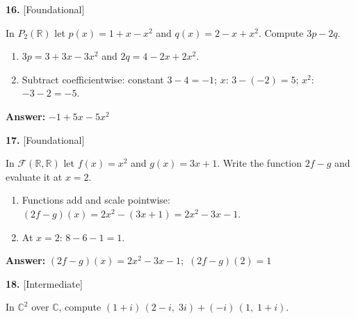 \documentclass[11pt]{article}
\begin{document}
\par\vspace{2pt}
\begin{minipage}{\linewidth}\textbf{16.} \hfill{\scriptsize\color{ink}[Foundational]}\par\nopagebreak In $P_{2}(\mathbb{R})$ let $p(x)=1+x-x^{2}$ and $q(x)=2-x+x^{2}$. Compute $3p-2q$.
\end{minipage}\par\nopagebreak
\begin{tcolorbox}[breakable,colback=ans,colframe=ansb,boxrule=0.5pt,left=4pt,right=4pt,top=2pt,bottom=2pt]\begin{enumerate}[leftmargin=2.2em,itemsep=1pt,topsep=1pt,label=\textbf{Step \arabic*.}]\item $3p=3+3x-3x^{2}$ and $2q=4-2x+2x^{2}$.
\item Subtract coefficientwise: constant $3-4=-1$; $x$: $3-(-2)=5$; $x^{2}$: $-3-2=-5$.
\end{enumerate}\textbf{Answer:} $-1+5x-5x^{2}$\end{tcolorbox}
\par\vspace{2pt}
\begin{minipage}{\linewidth}\textbf{17.} \hfill{\scriptsize\color{ink}[Foundational]}\par\nopagebreak In $\mathcal F(\mathbb{R},\mathbb{R})$ let $f(x)=x^{2}$ and $g(x)=3x+1$. Write the function $2f-g$ and evaluate it at $x=2$.
\end{minipage}\par\nopagebreak
\begin{tcolorbox}[breakable,colback=ans,colframe=ansb,boxrule=0.5pt,left=4pt,right=4pt,top=2pt,bottom=2pt]\begin{enumerate}[leftmargin=2.2em,itemsep=1pt,topsep=1pt,label=\textbf{Step \arabic*.}]\item Functions add and scale pointwise: $(2f-g)(x)=2x^{2}-(3x+1)=2x^{2}-3x-1$.
\item At $x=2$: $8-6-1=1$.
\end{enumerate}\textbf{Answer:} $(2f-g)(x)=2x^{2}-3x-1$;\ $(2f-g)(2)=1$\end{tcolorbox}
\par\vspace{2pt}
\begin{minipage}{\linewidth}\textbf{18.} \hfill{\scriptsize\color{ink}[Intermediate]}\par\nopagebreak In $\mathbb{C}^{2}$ over $\mathbb{C}$, compute $(1+i)\,(2-i,\;3i)+(-i)\,(1,\;1+i)$.
\end{minipage}\par\nopagebreak
\end{document}
